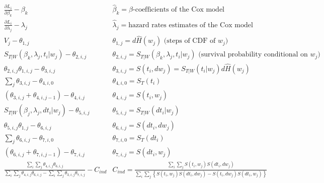 \documentclass[]{article}\usepackage[]{graphicx}\usepackage[]{color}
\begin{document}
\begin{align*}
  &\frac{\partial L_i}{\partial \beta_k} - \beta_k &   \widehat{\beta}_k = \beta\text{-coefficients of the Cox model}\\
  &\frac{\partial L_i}{\partial \lambda _j} - \lambda_j &  \widehat{\lambda}_j = \text{hazard rates estimates of the Cox model}\\
  &V _j - \theta_{1,j} &  \theta_{1,j} = d\widehat{H}(w_j) \text{ (steps of CDF of $w_j$)}\\
  & S_{T|W}(\beta_k, \lambda_j, t_i|w_j) - \theta_{2,i,j}    &  \theta_{2,i,j} =  S_{T|W}(\beta_k, \lambda_j, t_i|w_j) \text{ (survival probability conditional on $w_j$)}  \\
  &\theta_{2,i,j}\theta_{1,i,j} - \theta_{3,i,j}    &    \theta_{3,i,j}= S (t_i,dw_j) =  S_{T|W}(t_i|w_j) d\widehat{H}(w_j) \\
  & \sum_j \theta_{3,i,j} - \theta_{4,i,0}    &  \theta_{4,i,0} = S_T(t_i)   \\
  &  (\theta_{3,i,j} + \theta_{4,i,j-1}) -  \theta_{4,i,j}  &    \theta_{4,i,j} = S (t_i, w_j) \\
  &   S_{T|W}(\beta_j, \lambda_j, dt_i|w_j) -  \theta_{5,i,j} &   \theta_{5,i,j}  =  S_{T|W}(dt_i|w_j) \\
  &   \theta_{5,i,j}\theta_{1,j} -  \theta_{6,i,j} &    \theta_{6,i,j} = S (dt_i, dw_j) \\
  &   \sum_j \theta_{6,i,j} - \theta_{7,i,0}  &   \theta_{7,i,0} = S_T(dt_i)  \\
  &   (\theta_{6,i,j} + \theta_{7,i,j-1}) - \theta_{7,i,j}  &    \theta_{7,i,j} = S (dt_i, w_j)  \\
  & \frac{ \sum_i \sum_j  \theta_{4,i,j}  \theta_{6,i,j}}{ \sum_i \sum_j  \theta_{4,i,j}  \theta_{6,i,j} - \sum_i \sum_j  \theta_{3,i,j}  \theta_{7,i,j}} - C_{ind}  &   C_{ind}  = \frac{ \sum_i \sum_j  S (t_i, w_j)   S (dt_i, dw_j)  }{ \sum_i \sum_j  \left\{  S (t_i, w_j)S (dt_i, dw_j)  -  S (t_i, dw_j) S (dt_i, w_j)  \right\} } \\
\end{align*}
\end{document}
